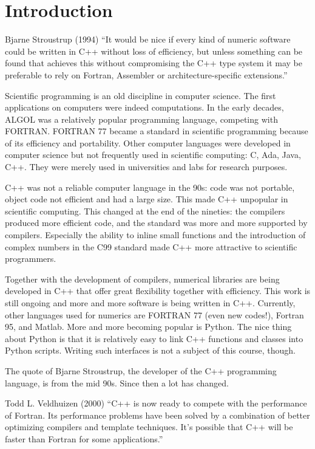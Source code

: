 \chapter{Introduction}
\begin{zitat}{Bjarne Stroustrup (1994) \cite{stroustrup1994design}}
  ``It would be nice if every kind of numeric software could be written in C++ without loss of efficiency, but unless something
  can be found that achieves this without compromising the C++ type system it may be preferable to rely on Fortran, Assembler or
  architecture-specific extensions.''
\end{zitat}

Scientific programming is an old discipline in computer science. The first applications on computers were indeed computations.
In the early decades, ALGOL was a relatively popular programming language, competing with FORTRAN. FORTRAN 77 became a standard
in scientific programming because of its efficiency and portability. Other computer languages were developed in computer science
but not frequently used in scientific computing: C, Ada, Java, C++. They were merely used in universities and labs for research
purposes.

C++ was not a reliable computer language in the 90s: code was not portable, object code not efficient and had a large size. This
made C++ unpopular in scientific computing. This changed at the end of the nineties: the compilers produced more efficient code,
and the standard was more and more supported by compilers. Especially the ability to inline small functions and the introduction
of complex numbers in the C99 standard made C++ more attractive to scientific programmers.

Together with the development of compilers, numerical libraries are being developed in C++ that offer great flexibility together
with efficiency. This work is still ongoing and more and more software is being written in C++. Currently, other languages used
for numerics are FORTRAN 77 (even new codes!), Fortran 95, and Matlab. More and more becoming popular is Python. The nice thing
about Python is that it is relatively easy to link C++ functions and classes into Python scripts. Writing such interfaces is not
a subject of this course, though.

The quote of Bjarne Stroustrup, the developer of the C++ programming language, is from the mid 90s. Since then a lot has changed.
\begin{zitat}{Todd L. Veldhuizen (2000) \cite{veldhuizen2000}}
  ``C++ is now ready to compete with the performance of Fortran. Its performance problems have been solved by a combination of
  better optimizing compilers and template techniques. It's possible that C++ will be faster than Fortran for some applications.''
\end{zitat}


